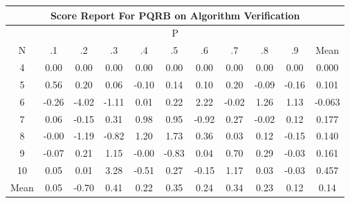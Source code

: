 \documentclass[11pt,a4paper]{report}
\begin{document}
\begin{longtable}{ | c || c | c | c | c | c | c | c | c | c || c |}
\hline
\multicolumn{11}{|c|}{ Score Report For PQRB on Algorithm Verification} \\
\hline
\multicolumn{11}{|c|}{ P } \\
\hline
N & .1 & .2 & .3 & .4 & .5 & .6 & .7 & .8 & .9 & Mean\\
 \hline
 \hline
 \endhead
  4 &  \cellcolor[HTML]{FFFFFF} 0.00 &  \cellcolor[HTML]{FFFFFF} 0.00 &  \cellcolor[HTML]{FFFFFF} 0.00 &  \cellcolor[HTML]{FFFFFF} 0.00 &  \cellcolor[HTML]{FFFFFF} 0.00 &  \cellcolor[HTML]{FFFFFF} 0.00 &  \cellcolor[HTML]{FFFFFF} 0.00 &  \cellcolor[HTML]{FFFFFF} 0.00 &  \cellcolor[HTML]{FFFFFF} 0.00 & 0.000 \\
  5 &  \cellcolor[HTML]{EFEFFF} 0.56 &  \cellcolor[HTML]{F7F7FF} 0.20 &  \cellcolor[HTML]{FFFFFF} 0.06 &  \cellcolor[HTML]{FFFFFF} -0.10 &  \cellcolor[HTML]{FFFFFF} 0.14 &  \cellcolor[HTML]{FFFFFF} 0.10 &  \cellcolor[HTML]{F7F7FF} 0.20 &  \cellcolor[HTML]{FFFFFF} -0.09 &  \cellcolor[HTML]{FFFFFF} -0.16 & 0.101 \\
  6 &  \cellcolor[HTML]{FFF7F7} -0.26 &  \cellcolor[HTML]{FF9797} -4.02 &  \cellcolor[HTML]{FFDFDF} -1.11 &  \cellcolor[HTML]{FFFFFF} 0.01 &  \cellcolor[HTML]{F7F7FF} 0.22 &  \cellcolor[HTML]{C7C7FF} 2.22 &  \cellcolor[HTML]{FFFFFF} -0.02 &  \cellcolor[HTML]{DFDFFF} 1.26 &  \cellcolor[HTML]{DFDFFF} 1.13 & -0.063 \\
  7 &  \cellcolor[HTML]{FFFFFF} 0.06 &  \cellcolor[HTML]{FFFFFF} -0.15 &  \cellcolor[HTML]{F7F7FF} 0.31 &  \cellcolor[HTML]{E7E7FF} 0.98 &  \cellcolor[HTML]{E7E7FF} 0.95 &  \cellcolor[HTML]{FFE7E7} -0.92 &  \cellcolor[HTML]{F7F7FF} 0.27 &  \cellcolor[HTML]{FFFFFF} -0.02 &  \cellcolor[HTML]{FFFFFF} 0.12 & 0.177 \\
  8 &  \cellcolor[HTML]{FFFFFF} -0.00 &  \cellcolor[HTML]{FFDFDF} -1.19 &  \cellcolor[HTML]{FFE7E7} -0.82 &  \cellcolor[HTML]{DFDFFF} 1.20 &  \cellcolor[HTML]{D7D7FF} 1.73 &  \cellcolor[HTML]{F7F7FF} 0.36 &  \cellcolor[HTML]{FFFFFF} 0.03 &  \cellcolor[HTML]{FFFFFF} 0.12 &  \cellcolor[HTML]{FFFFFF} -0.15 & 0.140 \\
  9 &  \cellcolor[HTML]{FFFFFF} -0.07 &  \cellcolor[HTML]{F7F7FF} 0.21 &  \cellcolor[HTML]{DFDFFF} 1.15 &  \cellcolor[HTML]{FFFFFF} -0.00 &  \cellcolor[HTML]{FFE7E7} -0.83 &  \cellcolor[HTML]{FFFFFF} 0.04 &  \cellcolor[HTML]{EFEFFF} 0.70 &  \cellcolor[HTML]{F7F7FF} 0.29 &  \cellcolor[HTML]{FFFFFF} -0.03 & 0.161 \\
  10 &  \cellcolor[HTML]{FFFFFF} 0.05 &  \cellcolor[HTML]{FFFFFF} 0.01 &  \cellcolor[HTML]{AFAFFF} 3.28 &  \cellcolor[HTML]{FFEFEF} -0.51 &  \cellcolor[HTML]{F7F7FF} 0.27 &  \cellcolor[HTML]{FFFFFF} -0.15 &  \cellcolor[HTML]{DFDFFF} 1.17 &  \cellcolor[HTML]{FFFFFF} 0.03 &  \cellcolor[HTML]{FFFFFF} -0.03 & 0.457 \\
 \hline
 \hline
Mean &  \cellcolor[HTML]{FFFFFF} 0.05 &  \cellcolor[HTML]{FFEFEF} -0.70 &  \cellcolor[HTML]{F7F7FF} 0.41 &  \cellcolor[HTML]{F7F7FF} 0.22 &  \cellcolor[HTML]{F7F7FF} 0.35 &  \cellcolor[HTML]{F7F7FF} 0.24 &  \cellcolor[HTML]{F7F7FF} 0.34 &  \cellcolor[HTML]{F7F7FF} 0.23 &  \cellcolor[HTML]{FFFFFF} 0.12 &  \cellcolor[HTML]{FFFFFF} 0.14
\end{longtable}
\end{document}
